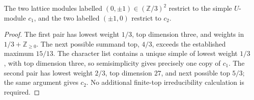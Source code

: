 \begin{corollary}
\label{cor:unmixed-lattice-restrictions}
The two lattice modules labelled $(0,\pm1)\in(\mathbb Z/3)^2$
restrict to the simple $U$-module $c_1$, and the two labelled
$(\pm1,0)$ restrict to $c_2$.
\end{corollary}
\begin{proof}
The first pair has lowest weight $1/3$, top dimension three, and
weights in $1/3+\mathbb Z_{\ge0}$. The next possible summand top,
$4/3$, exceeds the established maximum $15/13$. The character list
contains a unique simple of lowest weight $1/3$, with top dimension
three, so semisimplicity gives precisely one copy of $c_1$.
The second pair has lowest weight $2/3$, top dimension $27$, and
next possible top $5/3$; the same argument gives $c_2$.
No additional finite-top irreducibility calculation is required.
\end{proof}
